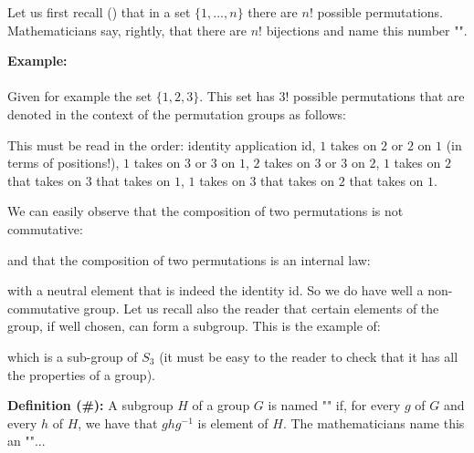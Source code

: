 	Let us first recall () that in a set $\{1,...,n\}$ there are $n!$ possible permutations. Mathematicians say, rightly, that there are $n!$ bijections and name this number "".
	
	\begin{tcolorbox}[colframe=black,colback=white,sharp corners]
	\textbf{{\Large {}}Example:}\\\\
	Given for example the set $\{1,2,3\}$. This set has $3!$ possible permutations that are denoted in the context of the permutation groups as follows:
	
	This must be read in the order: identity application id, $1$ takes on $2$ or $2$ on $1$ (in terms of positions!), $1$ takes on $3$ or $3$ on $1$, $2$ takes on $3$ or $3$ on $2$, $1$ takes on $2$ that takes on $3$ that takes on $1$, $1$ takes on $3$ that takes on $2$ that takes on $1$.
	
	We can easily observe that the composition of two permutations is not commutative:
	
	and that the composition of two permutations is an internal law:
	
	with a neutral element that is indeed the identity id. So we do have well a non-commutative group. Let us recall also the reader that certain elements of the group, if well chosen, can form a subgroup. This is the example of:
	
	which is a sub-group of $S_3$ (it must be easy to the reader to check that it has all the properties of a group).
	\end{tcolorbox}
	
	\pagebreak
	\textbf{Definition (\#\mydef):} A subgroup $H$ of a group $G$ is named "" if, for every $g$ of $G$ and every $h$ of $H$, we have that $ghg^{-1}$ is element of $H$. The mathematicians name this an ""...
	
